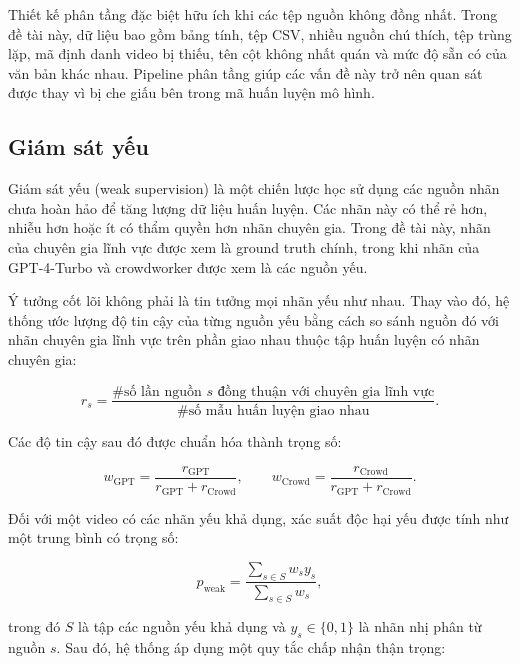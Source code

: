Thiết kế phân tầng đặc biệt hữu ích khi các tệp nguồn không đồng nhất. Trong đề tài này, dữ liệu bao gồm bảng tính, tệp CSV, nhiều nguồn chú thích, tệp trùng lặp, mã định danh video bị thiếu, tên cột không nhất quán và mức độ sẵn có của văn bản khác nhau. Pipeline phân tầng giúp các vấn đề này trở nên quan sát được thay vì bị che giấu bên trong mã huấn luyện mô hình.

\subsection{Giám sát yếu}

Giám sát yếu (weak supervision) là một chiến lược học sử dụng các nguồn nhãn chưa hoàn hảo để tăng lượng dữ liệu huấn luyện. Các nhãn này có thể rẻ hơn, nhiễu hơn hoặc ít có thẩm quyền hơn nhãn chuyên gia. Trong đề tài này, nhãn của chuyên gia lĩnh vực được xem là ground truth chính, trong khi nhãn của GPT-4-Turbo và crowdworker được xem là các nguồn yếu.

Ý tưởng cốt lõi không phải là tin tưởng mọi nhãn yếu như nhau. Thay vào đó, hệ thống ước lượng độ tin cậy của từng nguồn yếu bằng cách so sánh nguồn đó với nhãn chuyên gia lĩnh vực trên phần giao nhau thuộc tập huấn luyện có nhãn chuyên gia:

\begin{equation}
    r_s = \frac{\#\text{số lần nguồn }s\text{ đồng thuận với chuyên gia lĩnh vực}}{\#\text{số mẫu huấn luyện giao nhau}}.
\end{equation}

Các độ tin cậy sau đó được chuẩn hóa thành trọng số:

\begin{equation}
    w_{\text{GPT}} =
    \frac{r_{\text{GPT}}}{r_{\text{GPT}} + r_{\text{Crowd}}},
    \qquad
    w_{\text{Crowd}} =
    \frac{r_{\text{Crowd}}}{r_{\text{GPT}} + r_{\text{Crowd}}}.
\end{equation}

Đối với một video có các nhãn yếu khả dụng, xác suất độc hại yếu được tính như một trung bình có trọng số:

\begin{equation}
    p_{\text{weak}} =
    \frac{\sum_{s \in S} w_s y_s}{\sum_{s \in S} w_s},
\end{equation}

trong đó \(S\) là tập các nguồn yếu khả dụng và \(y_s \in \{0,1\}\) là nhãn nhị phân từ nguồn \(s\). Sau đó, hệ thống áp dụng một quy tắc chấp nhận thận trọng:

